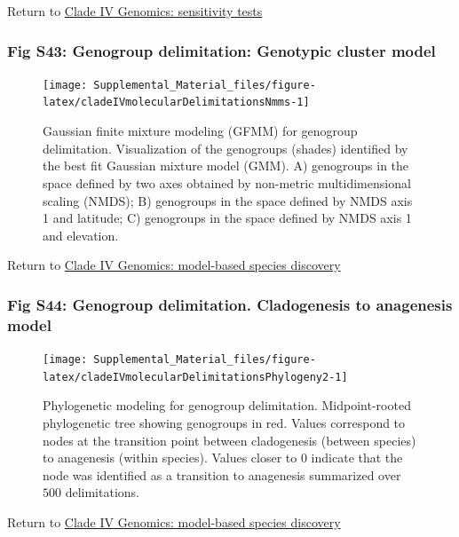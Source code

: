 \documentclass[
  11pt,
]{article}
\begin{document}
Return to \protect\hyperlink{sensitivity-tests-3}{Clade IV Genomics: sensitivity tests}
\pagebreak

\hypertarget{fig-s43-genogroup-delimitation-genotypic-cluster-model}{%
\subsubsection{Fig S43: Genogroup delimitation: Genotypic cluster model}\label{fig-s43-genogroup-delimitation-genotypic-cluster-model}}

\begin{figure}
\texttt{[image: Supplemental\_Material\_files/figure-latex/cladeIVmolecularDelimitationsNmms-1]} \caption{Gaussian finite mixture modeling (GFMM) for genogroup delimitation. Visualization of the genogroups (shades) identified by the best fit Gaussian mixture model (GMM). A) genogroups in the space defined by two axes obtained by non-metric multidimensional scaling (NMDS); B) genogroups in the space defined by NMDS axis 1 and latitude; C) genogroups in the space defined by NMDS axis 1 and elevation.}\label{fig:cladeIVmolecularDelimitationsNmms}
\end{figure}

Return to \protect\hyperlink{model-based-species-discovery-7}{Clade IV Genomics: model-based species discovery}
\pagebreak

\hypertarget{fig-s44-genogroup-delimitation.-cladogenesis-to-anagenesis-model}{%
\subsubsection{Fig S44: Genogroup delimitation. Cladogenesis to anagenesis model}\label{fig-s44-genogroup-delimitation.-cladogenesis-to-anagenesis-model}}

\begin{figure}
\texttt{[image: Supplemental\_Material\_files/figure-latex/cladeIVmolecularDelimitationsPhylogeny2-1]} \caption{Phylogenetic modeling for genogroup delimitation. Midpoint-rooted phylogenetic tree showing genogroups in red. Values correspond to nodes at the transition point between cladogenesis (between species) to anagenesis (within species). Values closer to 0 indicate that the node was identified as a transition to anagenesis summarized over $500$ delimitations.}\label{fig:cladeIVmolecularDelimitationsPhylogeny2}
\end{figure}

Return to \protect\hyperlink{model-based-species-discovery-7}{Clade IV Genomics: model-based species discovery}
\pagebreak
\end{document}
